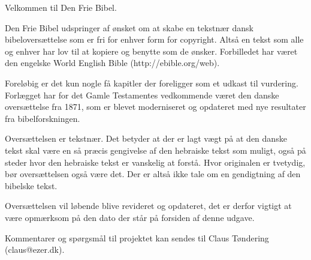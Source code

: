 Velkommen til Den Frie Bibel.

Den Frie Bibel udspringer af ønsket om at skabe en tekstnær dansk bibeloversættelse som er fri for
enhver form for copyright. Altså en tekst som alle og enhver har lov til at kopiere og benytte som
de ønsker. Forbilledet har været den engelske World English Bible (http://ebible.org/web).

Foreløbig er det kun nogle få kapitler der foreligger som et udkast
til vurdering. Forlægget har for det Gamle Testamentes vedkommende
været den danske oversættelse fra 1871, som er blevet moderniseret og
opdateret med nye resultater fra bibelforskningen.

Oversættelsen er tekstnær. Det betyder at der er lagt vægt på at den danske tekst skal være en så
præcis gengivelse af den hebraiske tekst som muligt, også på steder hvor den hebraiske tekst er
vanskelig at forstå. Hvor originalen er tvetydig, bør oversættelsen også være det. Der er altså ikke
tale om en gendigtning af den bibelske tekst.

Oversættelsen vil løbende blive revideret og opdateret, det er derfor vigtigt at være opmærksom på
den dato der står på forsiden af denne udgave.

Kommentarer og spørgsmål til projektet kan sendes til Claus Tøndering (claus@ezer.dk).
